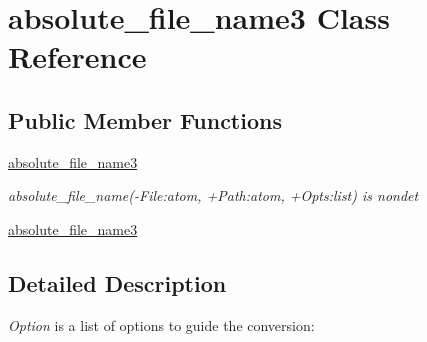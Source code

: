\section{absolute\+\_\+file\+\_\+name3 Class Reference}
\label{classabsolute__file__name3}
\subsection*{Public Member Functions}
\begin{DoxyCompactItemize}
\item 
\hyperlink{classabsolute__file__name3_a93758d3a7230acf2fde9b549ba6008e7}{absolute\+\_\+file\+\_\+name3}
\begin{DoxyCompactList}\small\item\em absolute\+\_\+file\+\_\+name(-\/\+File\+:atom, +\+Path\+:atom, +\+Opts\+:list) is nondet \end{DoxyCompactList}\item 
\hyperlink{classabsolute__file__name3_a93758d3a7230acf2fde9b549ba6008e7}{absolute\+\_\+file\+\_\+name3}
\end{DoxyCompactItemize}


\subsection{Detailed Description}
{\itshape Option} is a list of options to guide the conversion\+:


